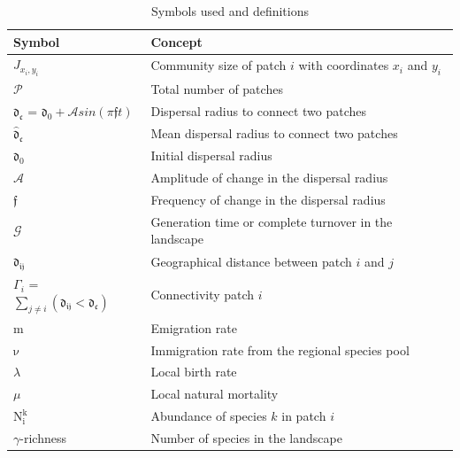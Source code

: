 \documentclass[12pt]{article}
\begin{document}
\newpage
\begin{table}[h]
\caption{Symbols used and definitions}
\begin{tabular}{  p{5cm}  |  p{10cm} }
 \hline
  \textbf{Symbol} & \textbf{Concept}\\  \hline
  $J_{x_i,y_i}$ & Community size of patch $i$ with coordinates $x_i$ and $y_i$ \\ \hline
  $\mathcal{P}$ & Total number of patches \\ \hline
  $\mathfrak{d_{c}}$ = $\mathfrak{d_{0}} + \mathcal{A} sin (\pi \mathfrak{f} t)$ & Dispersal radius to connect two patches \\ \hline
  $\mathfrak{\hat{d}_{c}}$ & Mean dispersal radius to connect two patches \\ \hline
  $\mathfrak{d_{0}}$ & Initial dispersal radius \\ \hline
  $\mathcal{A}$ & Amplitude of change in the dispersal radius \\ \hline
  $\mathfrak{f}$ & Frequency of change in the dispersal radius \\ \hline
  $\mathcal{G}$ & Generation time or complete turnover in the landscape \\ \hline
  $\mathfrak{d_{ij}}$ & Geographical distance between patch $i$ and $j$ \\ \hline
  $\Gamma_{i}$ = $\sum_{j \neq i} (\mathfrak{d_{ij}} < \mathfrak{d_{c}})$ & Connectivity patch $i$ \\ \hline
  $\mathrm{m}$ & Emigration rate \\ \hline
  $\mathrm{\nu}$ & Immigration rate from the regional species pool \\ \hline
  $\lambda$ & Local birth rate \\ \hline  $\mu$ & Local natural mortality \\ \hline
  $\mathrm{N^{k}_{i}}$ & Abundance of species $k$ in patch $i$ \\ \hline  
  $\gamma$-richness & Number of species in the landscape \\ \hline

\end{tabular}
\end{table}
\end{document}
